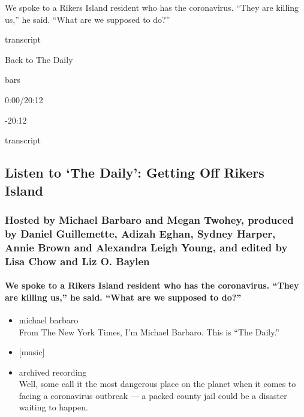We spoke to a Rikers Island resident who has the coronavirus. ``They are
killing us,'' he said. ``What are we supposed to do?''

transcript

Back to The Daily

bars

0:00/20:12

-20:12

transcript

\hypertarget{listen-to-the-daily-getting-off-rikers-island-1}{%
\subsection{Listen to `The Daily': Getting Off Rikers
Island}\label{listen-to-the-daily-getting-off-rikers-island-1}}

\hypertarget{hosted-by-michael-barbaro-and-megan-twohey-produced-by-daniel-guillemette-adizah-eghan-sydney-harper-annie-brown-and-alexandra-leigh-young-and-edited-by-lisa-chow-and-liz-o-baylen}{%
\subsubsection{Hosted by Michael Barbaro and Megan Twohey, produced by
Daniel Guillemette, Adizah Eghan, Sydney Harper, Annie Brown and
Alexandra Leigh Young, and edited by Lisa Chow and Liz O.
Baylen}\label{hosted-by-michael-barbaro-and-megan-twohey-produced-by-daniel-guillemette-adizah-eghan-sydney-harper-annie-brown-and-alexandra-leigh-young-and-edited-by-lisa-chow-and-liz-o-baylen}}

\hypertarget{we-spoke-to-a-rikers-island-resident-who-has-the-coronavirus-they-are-killing-us-he-said-what-are-we-supposed-to-do}{%
\paragraph{We spoke to a Rikers Island resident who has the coronavirus.
``They are killing us,'' he said. ``What are we supposed to
do?''}\label{we-spoke-to-a-rikers-island-resident-who-has-the-coronavirus-they-are-killing-us-he-said-what-are-we-supposed-to-do}}

\begin{itemize}
\item
  michael barbaro\\
  From The New York Times, I'm Michael Barbaro. This is ``The Daily.''
\item
  {[}music{]}
\item
  archived recording\\
  Well, some call it the most dangerous place on the planet when it
  comes to facing a coronavirus outbreak --- a packed county jail could
  be a disaster waiting to happen.
\end{itemize}

